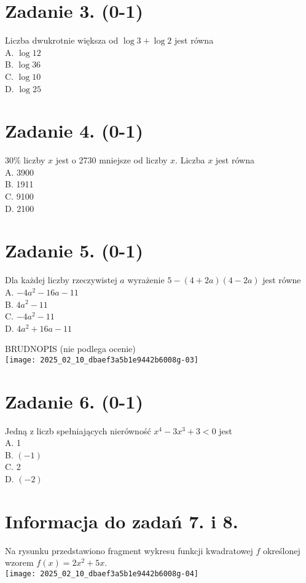 \documentclass[10pt]{article}
\begin{document}
\section*{Zadanie 3. (0-1)}
Liczba dwukrotnie większa od \(\log 3+\log 2\) jest równa\\
A. \(\log 12\)\\
B. \(\log 36\)\\
C. \(\log 10\)\\
D. \(\log 25\)

\section*{Zadanie 4. (0-1)}
30\% liczby \(x\) jest o 2730 mniejsze od liczby \(x\). Liczba \(x\) jest równa\\
A. 3900\\
B. 1911\\
C. 9100\\
D. 2100

\section*{Zadanie 5. (0-1)}
Dla każdej liczby rzeczywistej \(a\) wyrażenie \(5-(4+2 a)(4-2 a)\) jest równe\\
A. \(-4 a^{2}-16 a-11\)\\
B. \(4 a^{2}-11\)\\
C. \(-4 a^{2}-11\)\\
D. \(4 a^{2}+16 a-11\)

BRUDNOPIS (nie podlega ocenie)\\
\texttt{[image: 2025\_02\_10\_dbaef3a5b1e9442b6008g-03]}

\section*{Zadanie 6. (0-1)}
Jedną z liczb spełniających nierówność \(x^{4}-3 x^{3}+3<0\) jest\\
A. 1\\
B. \((-1)\)\\
C. 2\\
D. \((-2)\)

\section*{Informacja do zadań 7. i 8.}
Na rysunku przedstawiono fragment wykresu funkcji kwadratowej \(f\) określonej wzorem \(f(x)=2 x^{2}+5 x\).\\
\texttt{[image: 2025\_02\_10\_dbaef3a5b1e9442b6008g-04]}
\end{document}
